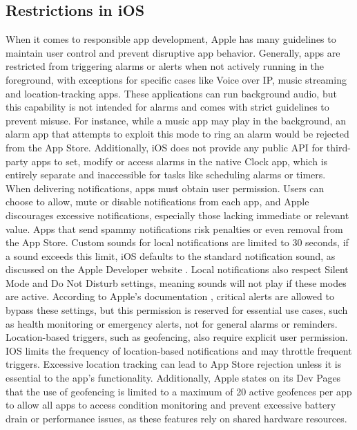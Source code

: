 \subsection{Restrictions in iOS}
When it comes to responsible app development, Apple has many guidelines to maintain user control and prevent disruptive app behavior. 
Generally, apps are restricted from triggering alarms or alerts when not actively running in the foreground, with exceptions for specific cases like Voice over IP, music streaming and location-tracking apps. 
These applications can run background audio, but this capability is not intended for alarms and comes with strict guidelines to prevent misuse. 
For instance, while a music app may play in the background, an alarm app that attempts to exploit this mode to ring an alarm would be rejected from the App Store.
Additionally, iOS does not provide any public API for third-party apps to set, modify or access alarms in the native Clock app, which is entirely separate and inaccessible for tasks like scheduling alarms or timers. 
When delivering notifications, apps must obtain user permission. 
Users can choose to allow, mute or disable notifications from each app, and Apple discourages excessive notifications, especially those lacking immediate or relevant value. 
Apps that send spammy notifications risk penalties or even removal from the App Store. 
Custom sounds for local notifications are limited to 30 seconds, if a sound exceeds this limit, iOS defaults to the standard notification sound, as discussed on the Apple Developer website \cite{apple_sound_guidelines}.
Local notifications also respect Silent Mode and Do Not Disturb settings, meaning sounds will not play if these modes are active. 
According to Apple's documentation \cite{apple_critical_alerts}, critical alerts are allowed to bypass these settings, but this permission is reserved for essential use cases, such as health monitoring or emergency alerts, not for general alarms or reminders. 
Location-based triggers, such as geofencing, also require explicit user permission. 
IOS \cite{apple_geofencing_limits} limits the frequency of location-based notifications and may throttle frequent triggers. 
Excessive location tracking can lead to App Store rejection unless it is essential to the app's functionality. 
Additionally, Apple states on its Dev Pages \cite{apple_geofencing} that the use of geofencing is limited to a maximum of 20 active geofences per app to allow all apps to access condition monitoring and prevent excessive battery drain or performance issues, as these features rely on shared hardware resources.

